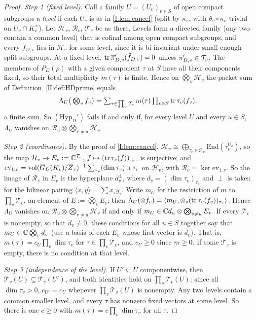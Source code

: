 \begin{proof}
\emph{Step 1 (fixed level).} Call a family $U=(U_v)_{v\in S}$ of open compact subgroups a \emph{level} if each $U_v$ is as in \cref{I:lem:cancel} (split by $\kappa_v$, with $\tilde\theta_v\circ\kappa_v$ trivial on $U_v\cap K_v^\times$). Let $\mathcal H_v$, $\mathcal R_v$, $\mathcal T_v$ be as there. Levels form a directed family (any two contain a common level) that is cofinal among open compact subgroups, and every $\tilde f_{D,v}$ lies in $\mathcal H_v$ for some level, since it is bi-invariant under small enough split subgroups. At a fixed level, $\operatorname{tr}\overline{\pi}'_{D,v}(\tilde f_{D,v})=0$ unless $\overline{\pi}'_{D,v}\in\mathcal T_v$. The members of $P_D(\rho)$ with a given component $\tau$ at $S$ have all their components fixed, so their total multiplicity $m(\tau)$ is finite. Hence on $\bigotimes_v\mathcal H_v$ the packet sum of Definition~\ref{II:def:HDprime} equals
\[ \Lambda_U\big(\textstyle\bigotimes_v f_v\big)=\sum_{\tau\in\prod_v\mathcal T_v}m(\tau)\prod_{v\in S}\operatorname{tr}\tau_v(f_v), \]
a finite sum. So $(\mathrm{Hyp}_D')$ fails if and only if, for every level $U$ and every $u\in S$, $\Lambda_U$ vanishes on $\mathcal R_u\otimes\bigotimes_{v\ne u}\mathcal H_v$.

\emph{Step 2 (coordinates).} By the proof of \cref{I:lem:cancel}, $\mathcal H_v\cong\bigoplus_{\tau_v\in\mathcal T_v}\mathrm{End}(\tau_v^{U_v})$, so the map $\mathcal H_v\to E_v:=\mathbb{C}^{\mathcal T_v}$, $f\mapsto(\operatorname{tr}\tau_v(f))_{\tau_v}$, is surjective; and $\mathrm{ev}_{1,v}=\operatorname{vol}(\overline{G}_D(K_v)/\overline{Z}_v)^{-1}\sum_{\tau_v}(\dim\tau_v)\operatorname{tr}\tau_v$ on $\mathcal H_v$, with $\mathcal R_v=\ker\mathrm{ev}_{1,v}$. So the image of $\mathcal R_v$ in $E_v$ is the hyperplane $d_v^\perp$, where $d_v=(\dim\tau_v)_{\tau_v}$ and $\perp$ is taken for the bilinear pairing $\langle x,y\rangle=\sum x_\tau y_\tau$. Write $m_U$ for the restriction of $m$ to $\prod_v\mathcal T_v$, an element of $E:=\bigotimes_vE_v$; then $\Lambda_U(\otimes f_v)=\langle m_U,\otimes_v(\operatorname{tr}\tau_v(f_v))_{\tau_v}\rangle$. Hence $\Lambda_U$ vanishes on $\mathcal R_u\otimes\bigotimes_{v\ne u}\mathcal H_v$ if and only if $m_U\in\mathbb{C} d_u\otimes\bigotimes_{v\ne u}E_v$. If every $\mathcal T_v$ is nonempty, so that $d_v\ne0$, these conditions for all $u\in S$ together say that $m_U\in\mathbb{C}\bigotimes_vd_v$ (use a basis of each $E_v$ whose first vector is $d_v$). That is, $m(\tau)=c_U\prod_v\dim\tau_v$ for $\tau\in\prod_v\mathcal T_v$, and $c_U\ge0$ since $m\ge0$. If some $\mathcal T_v$ is empty, there is no condition at that level.

\emph{Step 3 (independence of the level).} If $U'\subseteq U$ componentwise, then $\mathcal T_v(U)\subseteq\mathcal T_v(U')$, and both identities hold on $\prod_v\mathcal T_v(U)$; since all $\dim\tau_v>0$, $c_{U'}=c_U$ whenever $\prod_v\mathcal T_v(U)$ is nonempty. Any two levels contain a common smaller level, and every $\tau$ has nonzero fixed vectors at some level. So there is one $c\ge0$ with $m(\tau)=c\prod_v\dim\tau_v$ for all $\tau$.


\end{proof}
